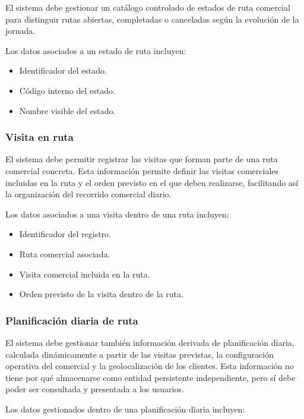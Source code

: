 El sistema debe gestionar un catálogo controlado de estados de ruta comercial para distinguir rutas abiertas, completadas o canceladas según la evolución de la jornada.

Los datos asociados a un estado de ruta incluyen:

\begin{itemize}
    \item Identificador del estado.
    \item Código interno del estado.
    \item Nombre visible del estado.
\end{itemize}

\subsubsection*{Visita en ruta}

El sistema debe permitir registrar las visitas que forman parte de una ruta comercial concreta. Esta información permite definir las visitas comerciales incluidas en la ruta y el orden previsto en el que deben realizarse, facilitando así la organización del recorrido comercial diario.

Los datos asociados a una visita dentro de una ruta incluyen:

\begin{itemize}
    \item Identificador del registro.
    \item Ruta comercial asociada.
    \item Visita comercial incluida en la ruta.
    \item Orden previsto de la visita dentro de la ruta.
\end{itemize}

\subsubsection*{Planificación diaria de ruta}

El sistema debe gestionar también información derivada de planificación diaria, calculada dinámicamente a partir de las visitas previstas, la configuración operativa del comercial y la geolocalización de los clientes. Esta información no tiene por qué almacenarse como entidad persistente independiente, pero sí debe poder ser consultada y presentada a los usuarios.

Los datos gestionados dentro de una planificación diaria incluyen:

